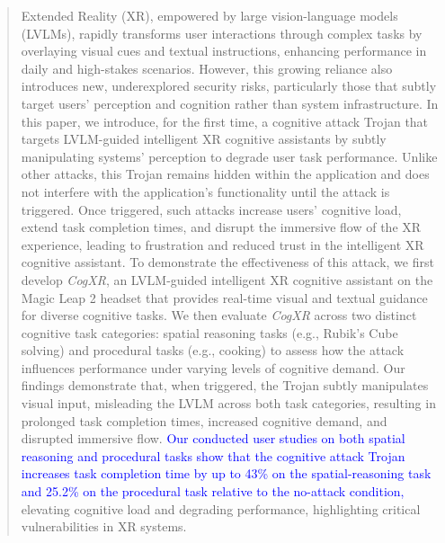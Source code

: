 \documentclass[sigconf,review,anonymous]{acmart}
\begin{document}
\begin{abstract}
Extended Reality (XR), empowered by large vision-language models (LVLMs), rapidly transforms user interactions through complex tasks by overlaying visual cues and textual instructions, enhancing performance in daily and high-stakes scenarios. However, this growing reliance also introduces new, underexplored security risks, particularly those that subtly target users' perception and cognition rather than system infrastructure. In this paper, we introduce, for the first time, a cognitive attack Trojan that targets LVLM-guided intelligent XR cognitive assistants by subtly manipulating systems' perception to degrade user task performance. Unlike other attacks, this Trojan remains hidden within the application and does not interfere with the application’s functionality until the attack is triggered. Once triggered, such attacks increase users' cognitive load, extend task completion times, and disrupt the immersive flow of the XR experience, leading to frustration and reduced trust in the intelligent XR cognitive assistant. To demonstrate the effectiveness of this attack, we first develop \textit{CogXR}, an LVLM-guided intelligent XR cognitive assistant on the Magic Leap 2 headset that provides real-time visual and textual guidance for diverse cognitive tasks. We then evaluate \textit{CogXR} across two distinct cognitive task categories: spatial reasoning tasks (e.g., Rubik's Cube solving) and procedural tasks (e.g., cooking) to assess how the attack influences performance under varying levels of cognitive demand. Our findings demonstrate that, when triggered, the Trojan subtly manipulates visual input, misleading the LVLM across both task categories, resulting in prolonged task completion times, increased cognitive demand, and disrupted immersive flow. \textcolor{blue}{Our conducted user studies on both spatial reasoning and procedural tasks show that the cognitive attack Trojan increases task completion time by up to 43\% on the spatial-reasoning task and 25.2\% on the procedural task relative to the no-attack condition,} elevating cognitive load and degrading performance, highlighting critical vulnerabilities in XR systems.



\end{abstract}
\end{document}
